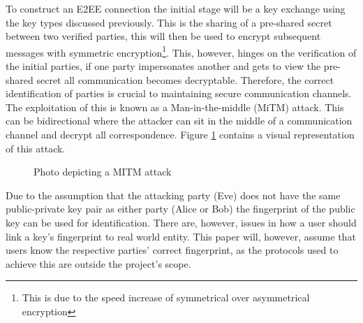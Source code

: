 To construct an E2EE connection the initial stage will be a key exchange using the key types discussed previously. This is the sharing of a pre-shared secret between two verified parties, this will then be used to encrypt subsequent messages with symmetric encryption\footnote{This is due to the speed increase of symmetrical over asymmetrical encryption}. This, however, hinges on the verification of the initial parties, if one party impersonates another and gets to view the pre-shared secret all communication becomes decryptable. Therefore, the correct identification of parties is crucial to maintaining secure communication channels. The exploitation of this is known as a Man-in-the-middle (MiTM) attack. This can be bidirectional where the attacker can sit in the middle of a communication channel and decrypt all correspondence. Figure \ref{fig:mitm} contains a visual representation of this attack.

\begin{center}
    
    \begin{figure}[h]
        \caption{Photo depicting a MITM attack}
        \label{fig:mitm}
    \end{figure}
\end{center}

Due to the assumption that the attacking party (Eve) does not have the same public-private key pair as either party (Alice or Bob) the fingerprint of the public key can be used for identification. There are, however, issues in how a user should link a key's fingerprint to real world entity. This paper will, however, assume that users know the respective parties' correct fingerprint, as the protocols used to achieve this are outside the project's scope.

